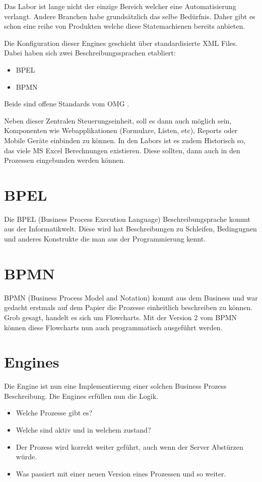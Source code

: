 \documentclass[paper=a4,twoside=false,BCOR=0mm,DIV=calc,fontsize=12pt]{scrartcl}
\begin{document}
Das Labor ist lange nicht der einzige Bereich welcher eine Automatisierung verlangt. Andere Branchen habe grundsätzlich das selbe
Bedürfnis. Daher gibt es schon eine reihe von Produkten welche diese Statemachienen bereits anbieten.

Die Konfiguration dieser Engines geschieht über standardisierte XML Files. Dabei haben sich zwei Beschreibungssprachen etabliert:
\begin{itemize}
 \item BPEL
 \item BPMN
\end{itemize}

Beide sind offene Standards vom OMG \cite{omg}.

Neben dieser Zentralen Steuerungseinheit, soll es dann auch möglich sein, Komponenten wie Webapplikationen (Formulare, Listen, etc),
Reports oder Mobile Geräte einbinden zu können. In den Labors ist es zudem Historisch so, das viele MS Excel Berechnungen existieren. Diese
sollten, dann auch in den Prozessen eingebunden werden können.


\section{BPEL}
Die BPEL (Business Process Execution Language) Beschreibungsprache kommt aus der Informatikwelt. Diese wird hat Beschreibungen zu
Schleifen, Bedingugnen und anderes Konstrukte die man aus der Programmierung kennt. 


\section{BPMN}
BPMN (Business Process Model and Notation) kommt aus dem Business und war gedacht erstmals auf dem Papier die Prozesse einheitlich
beschreiben zu können. Grob gesagt, handelt es sich um Flowcharts. 
Mit der Version 2 vom BPMN können diese Flowcharts nun auch programmatisch ausgeführt werden. 




\section{Engines}
Die Engine ist nun eine Implementierung einer solchen Business Prozess Beschreibung. Die Engines erfüllen nun die Logik. 
\begin{itemize}
  \item Welche Prozesse gibt es?
  \item Welche sind aktiv und in welchem zustand?
  \item Der Prozess wird korrekt weiter geführt, auch wenn der Server Abstürzen würde.
  \item Was passiert mit einer neuen Version eines Prozessen und so weiter.                      
\end{itemize}
\end{document}
